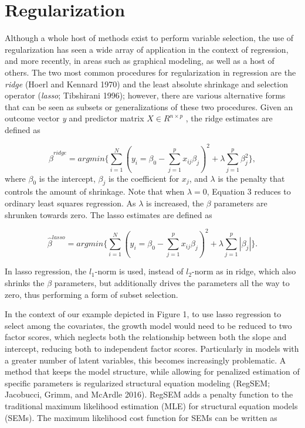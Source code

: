 \documentclass[article]{jss}
\begin{document}
\section{Regularization}\label{regularization}

Although a whole host of methods exist to perform variable selection,
the use of regularization has seen a wide array of application in the
context of regression, and more recently, in areas such as graphical
modeling, as well as a host of others. The two most common procedures
for regularization in regression are the \textit{ridge} (Hoerl and
Kennard 1970) and the least absolute shrinkage and selection operator
(\textit{lasso}; Tibshirani 1996); however, there are various
alternative forms that can be seen as subsets or generalizations of
these two procedures. Given an outcome vector \textit{y} and predictor
matrix \(X \in {R}^{n \times p}\) , the ridge estimates are defined as

\[\tag{1}
\hat{\beta}^{ridge}= argmin \Big\{ \sum_{i=1}^{N} (y_{i} = \beta_{0} - \sum_{j=1}^{p}x_{ij} \beta_{j})^{2}  + \lambda \sum_{j=1}^{p} \beta_{j}^{2}\Big\},
\] \noindent
where \(\beta_{0}\) is the intercept, \(\beta_{j}\) is the coefficient
for \(x_{j}\), and \(\lambda\) is the penalty that controls the amount
of shrinkage. Note that when \(\lambda = 0\), Equation 3 reduces to
ordinary least squares regression. As \(\lambda\) is increased, the
\(\beta\) parameters are shrunken towards zero. The lasso estimates are
defined as

\[\tag{2}
\hat{\beta}^{lasso}= argmin \Big\{ \sum_{i=1}^{N} (y_{i} = \beta_{0} - \sum_{j=1}^{p}x_{ij} \beta_{j})^{2}  + \lambda \sum_{j=1}^{p}|\beta_{j}|\Big\}.
\]

\noindent
In lasso regression, the \(l_{1}\)-norm is used, instead of
\(l_{2}\)-norm as in ridge, which also shrinks the \(\beta\) parameters,
but additionally drives the parameters all the way to zero, thus
performing a form of subset selection.

In the context of our example depicted in Figure 1, to use lasso
regression to select among the covariates, the growth model would need
to be reduced to two factor scores, which neglects both the relationship
between both the slope and intercept, reducing both to independent
factor scores. Particularly in models with a greater number of latent
variables, this becomes increasingly problematic. A method that keeps
the model structure, while allowing for penalized estimation of specific
parameters is regularized structural equation modeling (RegSEM;
Jacobucci, Grimm, and McArdle 2016). RegSEM adds a penalty function to
the traditional maximum likelihood estimation (MLE) for structural
equation models (SEMs). The maximum likelihood cost function for SEMs
can be written as
\end{document}
